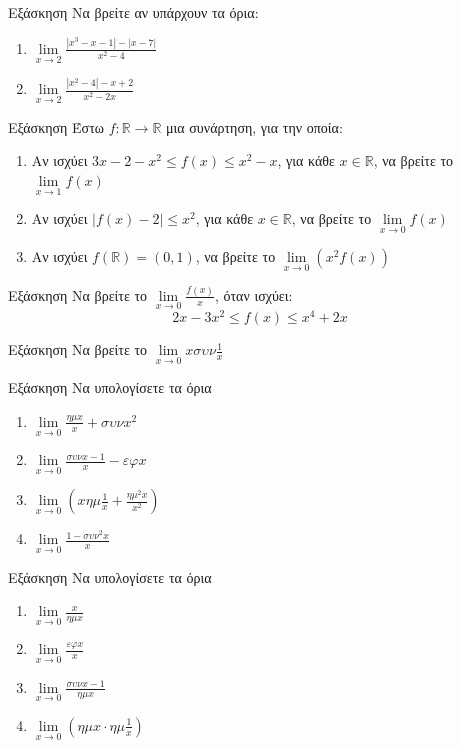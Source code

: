 \documentclass[greek]{beamer}
\begin{document}
\begin{frame}{Εξάσκηση}
  Να βρείτε αν υπάρχουν τα όρια:
  \begin{enumerate}
    \item $\lim\limits_{x \to 2}{ \frac{|x^3-x-1|-|x-7|}{x^2-4} }$ \pause
    \item $\lim\limits_{x \to 2}{ \frac{|x^2-4|-x+2}{x^2-2x} }$
  \end{enumerate}
\end{frame}

\begin{frame}{Εξάσκηση}
  Έστω $f:\mathbb{R}\to\mathbb{R}$ μια συνάρτηση, για την οποία:
  \begin{enumerate}
    \item Αν ισχύει $3x-2-x^2\le f(x) \le x^2-x$, για κάθε $x\in\mathbb{R}$, να βρείτε το $\lim\limits_{x \to 1}{ f(x) }$ \pause
    \item Αν ισχύει $|f(x)-2|\le x^2$, για κάθε $x\in\mathbb{R}$, να βρείτε το $\lim\limits_{x \to 0}{ f(x) }$ \pause
    \item Αν ισχύει $f(\mathbb{R})=(0,1)$, να βρείτε το $\lim\limits_{x \to 0}{ \left(x^2f(x)  \right) }$
  \end{enumerate}
\end{frame}

\begin{frame}{Εξάσκηση}
  Να βρείτε το $\lim\limits_{x \to 0}{ \frac{f(x)}{x} }$, όταν ισχύει:
  $$2x-3x^2\le f(x) \le x^4+2x$$
\end{frame}

\begin{frame}{Εξάσκηση}
  Να βρείτε το $\lim\limits_{x \to 0}{ xσυν\frac{1}{x} }$
\end{frame}

\begin{frame}{Εξάσκηση}
  Να υπολογίσετε τα όρια
  \begin{enumerate}
    \item $\lim\limits_{x \to 0}{ \frac{ημx}{x}+συνx^2 }$ \pause
    \item $\lim\limits_{x \to 0}{ \frac{συνx-1}{x}-εφx }$ \pause
    \item $\lim\limits_{x \to 0}{ \left( xημ\frac{1}{x}+\frac{ημ^2x}{x^2} \right)}$ \pause
    \item $\lim\limits_{x \to 0}{ \frac{1-συν^2x}{x} }$
  \end{enumerate}
\end{frame}

\begin{frame}{Εξάσκηση}
  Να υπολογίσετε τα όρια
  \begin{enumerate}
    \item $\lim\limits_{x \to 0}{ \frac{x}{ημx} }$ \pause
    \item $\lim\limits_{x \to 0}{ \frac{εφx}{x} }$ \pause
    \item $\lim\limits_{x \to 0}{ \frac{συνx-1}{ημx} }$ \pause
    \item $\lim\limits_{x \to 0}{ \left( ημx\cdot ημ\frac{1}{x} \right) }$
  \end{enumerate}
\end{frame}
\end{document}
